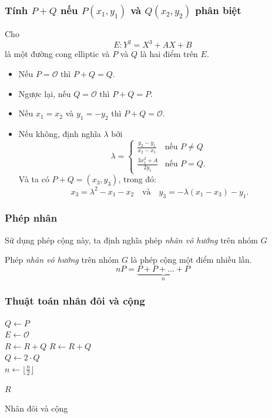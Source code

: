 \documentclass [xcolor=svgnames, t] {beamer}
\theoremstyle{definition}
\begin{document}
\begin{frame}
    \frametitle{Tính $P+Q$ nếu $P(x_1,y_1)$ và $Q(x_2,y_2)$ phân biệt  }
    Cho
    $$E:Y^2 = X^3 + AX + B$$
    là một đường cong elliptic và $P$  và $Q$ là hai điểm trên $E$.
    \begin{itemize}
        \item Nếu $P = \mathcal{O}$ thì $P + Q = Q$.
        \item Ngược lại, nếu $Q = \mathcal{O}$ thì $P + Q = P$.
        \item Nếu $x_1 = x_2$ và $y_1 = -y_2$ thì $P + Q = \mathcal{O}$.
        \item Nếu không, định nghĩa $\lambda$ bởi
              $$ \lambda = \begin{cases}
                      \frac{y_2-y_1}{x_2 - x_1} & \text{nếu } P \neq Q \\
                      \frac{3x_1^2 + A}{2y_1}   & \text{nếu } P = Q.
                  \end{cases} $$
              Và ta có $P + Q = (x_3, y_3)$, trong đó:
              $$x_3 = \lambda^2 - x_1 - x_2 \ \ \  \text{ và } \ \ \  y_3 = -\lambda(x_1 - x_3) - y_1.$$
    \end{itemize}


\end{frame}
\begin{frame}
    \frametitle{Phép nhân}
    Sử dụng phép cộng này, ta định nghĩa phép \textit{nhân vô hướng} trên nhóm $G$
    \begin{definition}
        Phép \textit{nhân vô hướng} trên nhóm $G$ là phép cộng một điểm nhiều lần.
        \begin{equation}
            nP = \underbrace{P+P+ \ldots +P}_{n}
        \end{equation}
    \end{definition}
\end{frame}
\begin{frame}
    \frametitle{Thuật toán nhân đôi và cộng}

    \begin{algorithm}[H]
        \Begin
        {
            $Q \gets P$ \\
            $E \gets \mathcal{O}$ \\
            {
                {
                    $R \gets R + Q$
                }
                {
                    $R \gets R + Q$ \\
                    $Q \gets 2 \cdot Q$ \\
                    $n \gets \lfloor \frac{n}{2} \rfloor $
                }
            }

            \Return $R$
        }
        \caption{Nhân đôi và cộng}
    \end{algorithm}

\end{frame}
\end{document}
